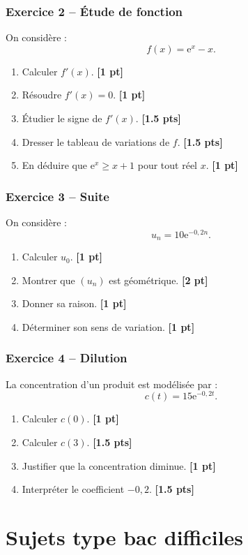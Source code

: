 \documentclass[11pt,a4paper]{article}
\newcommand{\e}{\mathrm{e}}
\newcommand{\pts}[1]{\hfill \textbf{[#1 pt]}}
\newcommand{\ptss}[1]{\hfill \textbf{[#1 pts]}}
\begin{document}
\subsubsection*{Exercice 2 -- Étude de fonction}

On considère :
\[
f(x)=\e^x-x.
\]
\begin{enumerate}
    \item Calculer $f'(x)$. \pts{1}
    \item Résoudre $f'(x)=0$. \pts{1}
    \item Étudier le signe de $f'(x)$. \ptss{1.5}
    \item Dresser le tableau de variations de $f$. \ptss{1.5}
    \item En déduire que $\e^x\geq x+1$ pour tout réel $x$. \pts{1}
\end{enumerate}

\subsubsection*{Exercice 3 -- Suite}

On considère :
\[
u_n=10\e^{-0,2n}.
\]
\begin{enumerate}
    \item Calculer $u_0$. \pts{1}
    \item Montrer que $(u_n)$ est géométrique. \pts{2}
    \item Donner sa raison. \pts{1}
    \item Déterminer son sens de variation. \pts{1}
\end{enumerate}

\subsubsection*{Exercice 4 -- Dilution}

La concentration d'un produit est modélisée par :
\[
c(t)=15\e^{-0,2t}.
\]
\begin{enumerate}
    \item Calculer $c(0)$. \pts{1}
    \item Calculer $c(3)$. \ptss{1.5}
    \item Justifier que la concentration diminue. \pts{1}
    \item Interpréter le coefficient $-0,2$. \ptss{1.5}
\end{enumerate}

\newpage

\section{Sujets type bac difficiles}
\end{document}
